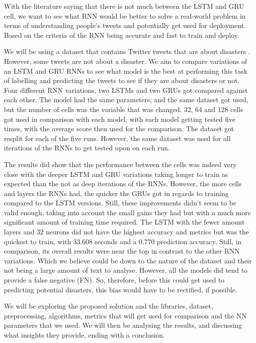 \documentclass[a4paper,10pt]{article}
\begin{document}
	With the literature saying that there is not much between the LSTM and GRU cell, we want to see what RNN would be better to solve a real-world problem in terms of understanding people's tweets and potentially get used for deployment. Based on the criteria of the RNN being accurate and fast to train and deploy.

	We will be using a dataset that contains Twitter tweets that are about disasters \cite{disater_kaggle}. However, some tweets are not about a disaster. We aim to compare variations of an LSTM and GRU RNNs to see what model is the best at performing this task of labelling and predicting the tweets to see if they are about disasters or not. Four different RNN variations, two LSTMs and two GRUs got compared against each other. The model had the same parameters, and the same dataset got used, but the number of cells was the variable that was changed. 32, 64 and 128 cells got used in comparison with each model, with each model getting tested five times, with the average score then used for the comparison. The dataset got resplit for each of the five runs. However, the same dataset was used for all iterations of the RNNs to get tested upon on each run. 
	
	The results did show that the performance between the cells was indeed very close with the deeper LSTM and GRU variations taking longer to train as expected than the not as deep iterations of the RNNs. However, the more cells and layers the RNNs had, the quicker the GRUs got in regards to training compared to the LSTM versions. Still, these improvements didn't seem to be valid enough, taking into account the small gains they had but with a much more significant amount of training time required. The LSTM with the fewer amount layers and 32 neurons did not have the highest accuracy and metrics but was the quickest to train, with 33.608 seconds and a 0.770 prediction accuracy. Still, in comparison, its overall results were near the top in contrast to the other RNN variations. Which we believe could be down to the nature of the dataset and their not being a large amount of text to analyse. However, all the models did tend to provide a false negative (FN). So, therefore, before this could get used to predicting potential disasters, this bias would have to be rectified, if possible.

	We will be exploring the proposed solution and the libraries, dataset, preprocessing, algorithms, metrics that will get used for comparison and the NN parameters that we used. We will then be analysing the results, and discussing what insights they provide, ending with a conclusion.
\end{document}
